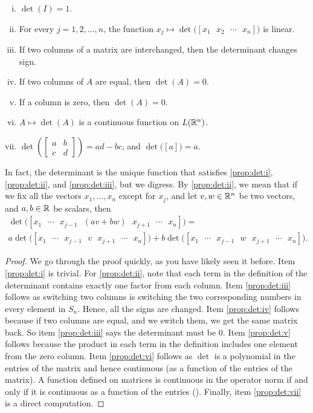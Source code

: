 \begin{prop}
\pagebreak[0]
\leavevmode
\begin{enumerate}[(i)]
\item \label{prop:det:i} $\det(I) = 1$.
\item \label{prop:det:ii} For every $j=1,2,\ldots,n$, the function $x_j
\mapsto \det\bigl([x_1 ~~~ x_2 ~~~ \cdots ~~~ x_n ]\bigr)$
is linear.
\item \label{prop:det:iii} If two columns of a matrix are interchanged, then the determinant changes
sign.
\item \label{prop:det:iv} If two columns of $A$ are equal, then $\det(A) = 0$.
\item \label{prop:det:v} If a column is zero, then $\det(A) = 0$.
\item \label{prop:det:vi} $A \mapsto \det(A)$ is a continuous function on
$L({\mathbb{R}}^n)$.
\item \label{prop:det:vii} $\det\left( \left[\begin{smallmatrix} a & b \\ c
&d \end{smallmatrix}\right] \right)
= ad-bc$, and $\det \bigl( [a] \bigr) = a$.
\end{enumerate}
\end{prop}

In fact, the determinant is the unique function that satisfies
\ref{prop:det:i},
\ref{prop:det:ii}, and
\ref{prop:det:iii},
but we digress.
By \ref{prop:det:ii}, we mean that if we fix all the vectors
$x_1,\ldots,x_n$ except for $x_j$, and let
$v,w \in {\mathbb{R}}^n$ be two vectors,
and $a,b \in {\mathbb{R}}$ be scalars, then
\begin{multline*}
\det\bigl([x_1 ~~~ \cdots ~~~ x_{j-1} ~~~ (av+bw) ~~~ x_{j+1} ~~~
\cdots ~~~ x_n]\bigr) =
\\
a \det\bigl([x_1 ~~~ \cdots ~~~ x_{j-1} ~~~ v ~~~ x_{j+1} ~~~
\cdots ~~~ x_n]\bigr)
+
b
\det\bigl([x_1 ~~~ \cdots ~~~ x_{j-1} ~~~ w ~~~ x_{j+1} ~~~ \cdots
~~~ x_n]\bigr) .
\end{multline*}

\begin{proof}
We go through the proof quickly, as you have likely seen it before.
%
Item \ref{prop:det:i} is trivial.  For \ref{prop:det:ii}, note that each term in the definition of the
determinant contains exactly one factor from each column.
%
Item \ref{prop:det:iii} follows as switching two columns is switching the
two corresponding numbers in every element in $S_n$.  Hence, all the signs
are changed.
Item \ref{prop:det:iv} follows because if two columns are equal, and we
switch them, we get
the same matrix back.  So item \ref{prop:det:iii} says the determinant must be 0.
%
Item \ref{prop:det:v} follows because the product in each term in the definition includes
one element from the zero column.
Item \ref{prop:det:vi} follows as $\det$ is a polynomial in the entries of the matrix
and hence continuous (as a function of the entries of the matrix).
A function defined on
matrices is continuous in the operator norm if and only if it is 
continuous as a function of the entries ().
Finally, item \ref{prop:det:vii} is a direct computation.
\end{proof}

